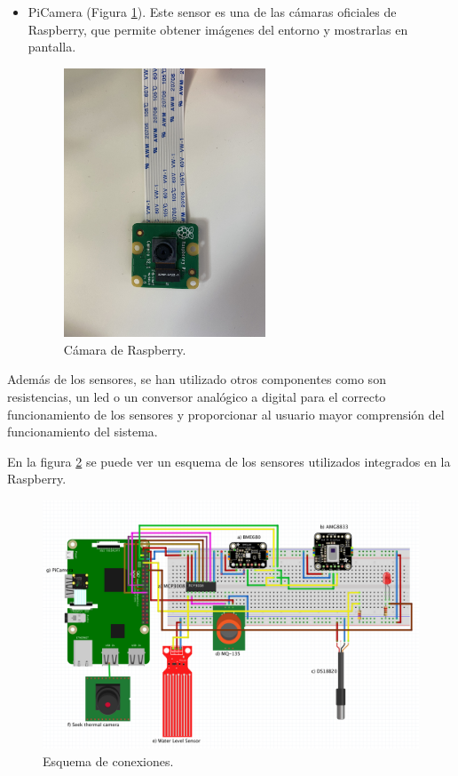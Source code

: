 \begin{itemize}
\item{PiCamera (Figura \ref{fig:picam}).} Este sensor es una de las cámaras oficiales de Raspberry, que permite obtener imágenes del entorno y mostrarlas en pantalla.
\begin{figure} [h!]
  \begin{center}
    \includegraphics[width=6cm]{figs/picam}
  \end{center}
  \caption{Cámara de Raspberry.}
  \label{fig:picam}
\end{figure}
\end{itemize}

Además de los sensores, se han utilizado otros componentes como son resistencias, un led o un conversor analógico a digital para el correcto funcionamiento de los sensores y proporcionar al usuario mayor comprensión del funcionamiento del sistema.

En la figura \ref{fig:esquema} se puede ver un esquema de los sensores utilizados integrados en la Raspberry.
\begin{figure} [h!]
  \begin{center}
    \includegraphics[width=14cm]{figs/esquema}
  \end{center}
  \caption{Esquema de conexiones.}
  \label{fig:esquema}
\end{figure}\\

